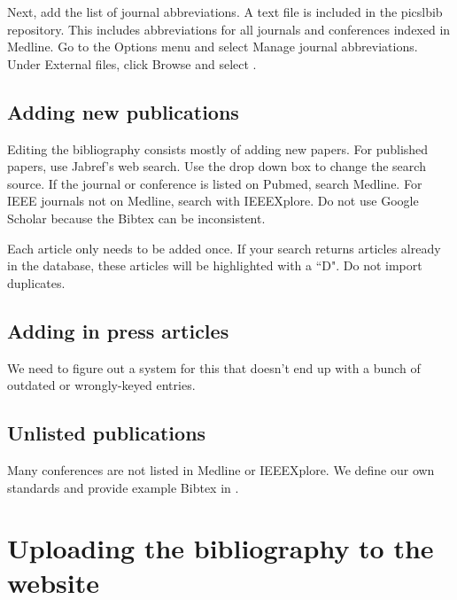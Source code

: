 \documentclass{InsightArticle}
\begin{document}
Next, add the list of journal abbreviations. A text file  is included in the picslbib repository. This includes abbreviations for all journals and conferences indexed in Medline. Go to the Options menu and select Manage journal abbreviations. Under External files, click Browse and select .


\subsection{Adding new publications}

Editing the bibliography consists mostly of adding new papers. For published papers, use Jabref's web search. Use the drop down box to change the search source. If the journal or conference is listed on Pubmed, search Medline. For IEEE journals not on Medline, search with IEEEXplore. Do not use Google Scholar because the Bibtex can be inconsistent.

Each article only needs to be added once. If your search returns articles already in the database, these articles will be highlighted with a ``D". Do not import duplicates.


\subsection{Adding in press articles}

We need to figure out a system for this that doesn't end up with a bunch of outdated or wrongly-keyed entries.


\subsection{Unlisted publications}

Many conferences are not listed in Medline or IEEEXplore.  We define our own standards and provide example Bibtex in .

\section{Uploading the bibliography to the website}
\end{document}
